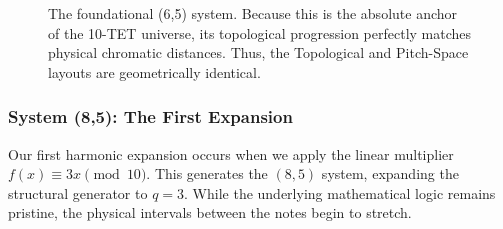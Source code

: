 \documentclass[11pt,letterpaper]{amsart}
\begin{document}
\begin{figure}[H]
\begin{minipage}{0.48\textwidth}
        \caption*{Pitch-Space Layout \\ (Geometric Rewiring)}
    \end{minipage}
    \caption{The foundational (6,5) system. Because this is the absolute anchor of the 10-TET universe, its topological progression perfectly matches physical chromatic distances. Thus, the Topological and Pitch-Space layouts are geometrically identical.}
\end{figure}

\subsubsection{System (8,5): The First Expansion}

Our first harmonic expansion occurs when we apply the linear multiplier $f(x) \equiv 3x \pmod{10}$. This generates the $(8,5)$ system, expanding the structural generator to $q=3$. While the underlying mathematical logic remains pristine, the physical intervals between the notes begin to stretch.
\end{document}
